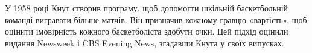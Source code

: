 \documentclass[a4paper]{report}
\begin{document}
    У 1958 році Кнут створив програму, щоб допомогти шкільній баскетбольній команді вигравати більше матчів. Він призначив кожному гравцю
    «вартість», щоб оцінити імовірність кожного баскетболіста здобути очки. Цей підхід оцінили видання Newsweek і CBS Evening News, згадавши Кнута
    у своїх випусках.
    
\end{document}
